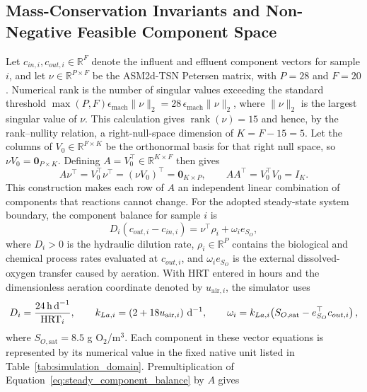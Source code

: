 \documentclass[a4paper,fleqn]{cas-sc}
\begin{document}
\subsection{Mass-Conservation Invariants and Non-Negative Feasible Component Space}

Let $c_{in,i},c_{out,i}\in\mathbb{R}^{F}$ denote the influent and effluent component vectors for sample $i$, and let $\nu\in\mathbb{R}^{P\times F}$ be the ASM2d-TSN Petersen matrix, with $P=28$ and $F=20$. Numerical rank is the number of singular values exceeding the standard threshold $\max(P,F)\epsilon_{\mathrm{mach}}\|\nu\|_2=28\,\epsilon_{\mathrm{mach}}\|\nu\|_2$, where $\|\nu\|_2$ is the largest singular value of $\nu$. This calculation gives $\operatorname{rank}(\nu)=15$ and hence, by the rank--nullity relation, a right-null-space dimension of $K=F-15=5$. Let the columns of $V_0\in\mathbb{R}^{F\times K}$ be the orthonormal basis for that right null space, so $\nu V_0=\mathbf{0}_{P\times K}$. Defining $A=V_0^\top\in\mathbb{R}^{K\times F}$ then gives
\begin{equation}
\label{eq:invariant_operator}
A\nu^\top=V_0^\top\nu^\top=(\nu V_0)^\top=\mathbf{0}_{K\times P},
\qquad
AA^\top=V_0^\top V_0=I_K.
\end{equation}
This construction makes each row of $A$ an independent linear combination of components that reactions cannot change. For the adopted steady-state system boundary, the component balance for sample $i$ is
\begin{equation}
\label{eq:steady_component_balance}
D_i(c_{out,i}-c_{in,i})=\nu^\top\rho_i+\omega_i e_{S_O},
\end{equation}
where $D_i>0$ is the hydraulic dilution rate, $\rho_i\in\mathbb{R}^{P}$ contains the biological and chemical process rates evaluated at $c_{out,i}$, and $\omega_i e_{S_O}$ is the external dissolved-oxygen transfer caused by aeration. With HRT entered in hours and the dimensionless aeration coordinate denoted by $u_{\mathrm{air},i}$, the simulator uses
\begin{equation}
D_i=\frac{24\,\mathrm{h\,d}^{-1}}{\mathrm{HRT}_i},\qquad
k_{La,i}=(2+18u_{\mathrm{air},i})\ {\rm d}^{-1},\qquad
\omega_i=k_{La,i}\!\left(S_{O,\mathrm{sat}}-e_{S_O}^\top c_{out,i}\right),
\end{equation}
where $S_{O,\mathrm{sat}}=8.5$ g O$_2$/m$^3$. Each component in these vector equations is represented by its numerical value in the fixed native unit listed in Table~\ref{tab:simulation_domain}. Premultiplication of Equation~\eqref{eq:steady_component_balance} by $A$ gives
\end{document}
